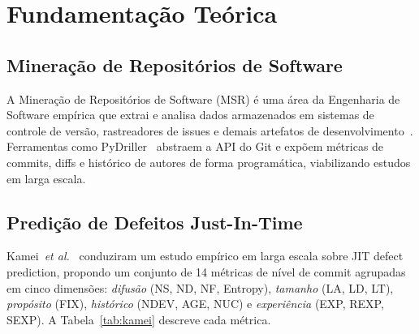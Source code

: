 \documentclass[12pt]{article}
\begin{document}
\section{Fundamentação Teórica}
\label{sec:fundamentos}

\subsection{Mineração de Repositórios de Software}

A Mineração de Repositórios de Software (MSR) é uma área da Engenharia de Software
empírica que extrai e analisa dados armazenados em sistemas de controle de versão,
rastreadores de issues e demais artefatos de desenvolvimento~\cite{hassan2008}.
Ferramentas como PyDriller~\cite{spadini2018} abstraem a API do Git e expõem
métricas de commits, diffs e histórico de autores de forma programática, viabilizando
estudos em larga escala.

\subsection{Predição de Defeitos Just-In-Time}

Kamei~\textit{et al.}~\cite{kamei2013} conduziram um estudo empírico em larga escala
sobre JIT defect prediction, propondo um conjunto de 14 métricas de nível de commit
agrupadas em cinco dimensões: \textit{difusão} (NS, ND, NF, Entropy),
\textit{tamanho} (LA, LD, LT), \textit{propósito} (FIX), \textit{histórico}
(NDEV, AGE, NUC) e \textit{experiência} (EXP, REXP, SEXP).
A Tabela~\ref{tab:kamei} descreve cada métrica.
\end{document}

